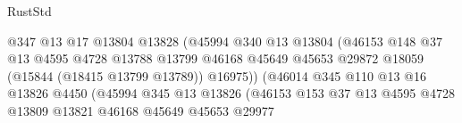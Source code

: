 \begin{lexlean}{RustStd}
\begin{coremodule}
                                              @347
                                              @13
                                              @17
                                              @13804
                                              @13828
                                              (@45994
                                                @340
                                                @13
                                                @13804
                                                (@46153
                                                  @148
                                                  @37
                                                  @13
                                                  @4595
                                                  @4728
                                                  @13788
                                                  @13799
                                                  @46168
                                                  @45649
                                                  @45653
                                                  @29872
                                                  @18059
                                                  (@15844 (@18415 @13799 @13789))
                                                  @16975))
                                              (@46014
                                                @345
                                                @110
                                                @13
                                                @16
                                                @13826
                                                @4450
                                                (@45994
                                                  @345
                                                  @13
                                                  @13826
                                                  (@46153
                                                    @153
                                                    @37
                                                    @13
                                                    @4595
                                                    @4728
                                                    @13809
                                                    @13821
                                                    @46168
                                                    @45649
                                                    @45653
                                                    @29977

\end{coremodule}
\end{lexlean}
